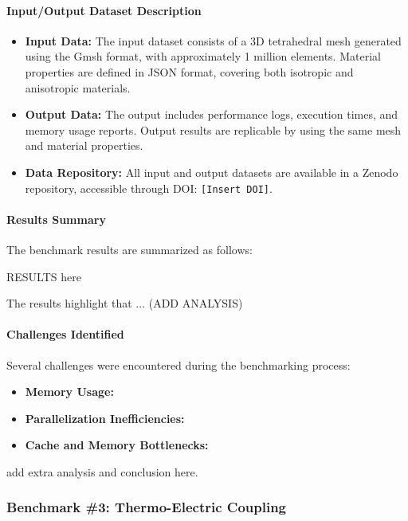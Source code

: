 \paragraph{Input/Output Dataset Description}
\begin{itemize}
    \item \textbf{Input Data:} The input dataset consists of a 3D tetrahedral mesh generated using the Gmsh format, with approximately 1 million elements. Material properties are defined in JSON format, covering both isotropic and anisotropic materials.

    \item \textbf{Output Data:} The output includes performance logs, execution times, and memory usage reports. Output results are replicable by using the same mesh and material properties.

    \item \textbf{Data Repository:} All input and output datasets are available in a Zenodo repository, accessible through DOI: \texttt{[Insert DOI]}.
\end{itemize}


\paragraph{Results Summary}
The benchmark results are summarized as follows:

RESULTS here

The results highlight that ... (ADD ANALYSIS)




\paragraph{Challenges Identified}
Several challenges were encountered during the benchmarking process:
\begin{itemize}
    \item \textbf{Memory Usage:}
    \item \textbf{Parallelization Inefficiencies:}
    \item \textbf{Cache and Memory Bottlenecks:}
\end{itemize}

add extra analysis  and conclusion here.

\subsubsection{Benchmark \#3: Thermo-Electric Coupling}

